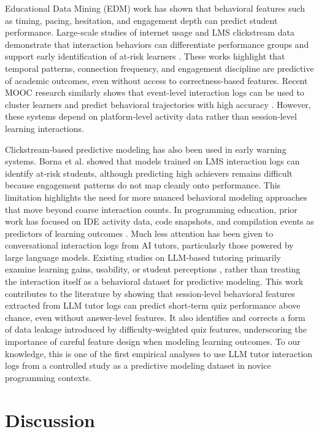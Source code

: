 \documentclass[conference]{IEEEtran}
\begin{document}
Educational Data Mining (EDM) work has shown that behavioral features such as timing, pacing, hesitation, and engagement depth can predict student performance\cite{encyclopedia4040108}. Large-scale studies of internet usage and LMS
clickstream data demonstrate that interaction behaviors can differentiate
performance groups and support early identification of at-risk learners
\cite{xu2019internetusage}. These works highlight that temporal patterns,
connection frequency, and engagement discipline are predictive of
academic outcomes, even without access to correctness-based features.
Recent MOOC research similarly shows that event-level interaction logs
can be used to cluster learners and predict behavioral trajectories with
high accuracy \cite{chonraksuk2024thaiMOOC}. However, these systems depend on platform‑level activity data rather than session‑level learning interactions.

Clickstream‑based predictive modeling has also been used in early warning systems. Borna et al. \cite{borna2024lms} showed that models trained on LMS interaction logs can identify at‑risk students, although predicting high achievers remains difficult because engagement patterns do not map cleanly onto performance. This limitation highlights the need for more nuanced behavioral modeling approaches that move beyond coarse interaction counts.
In programming education, prior work has focused on IDE activity data, code snapshots, and compilation events as predictors of learning outcomes \cite{piech2015deep, rivers2017automated}. Much less attention has been given to conversational interaction logs from AI tutors, particularly those powered by large language models. Existing studies on LLM‑based tutoring primarily examine learning gains, usability, or student perceptions \cite{kasneci2023chatgpt}, rather than treating the interaction itself as a behavioral dataset for predictive modeling.
This work contributes to the literature by showing that session‑level behavioral features extracted from LLM tutor logs can predict short‑term quiz performance above chance, even without answer‑level features. It also identifies and corrects a form of data leakage introduced by difficulty‑weighted quiz features, underscoring the importance of careful feature design when modeling learning outcomes. To our knowledge, this is one of the first empirical analyses to use LLM tutor interaction logs from a controlled study as a predictive modeling dataset in novice programming contexts.

\section{Discussion}
\end{document}
